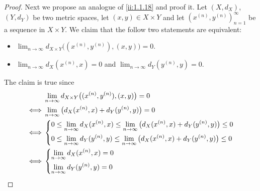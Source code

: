 \begin{proof}
  Next we propose an analogue of \cref{ii:1.1.18} and proof it.
  Let \((X, d_X)\), \((Y, d_Y)\) be two metric spaces, let \((x, y) \in X \times Y\) and let \((x^{(n)}, y^{(n)})_{n = 1}^\infty\) be a sequence in \(X \times Y\).
  We claim that the follow two statements are equivalent:
  \begin{itemize}
    \item \(\lim_{n \to \infty} d_{X \times Y}\big((x^{(n)}, y^{(n)}), (x, y)\big) = 0\).
    \item \(\lim_{n \to \infty} d_X(x^{(n)}, x) = 0\) and \(\lim_{n \to \infty} d_Y(y^{(n)}, y) = 0\).
  \end{itemize}
  The claim is true since
  \begin{align*}
         & \lim_{n \to \infty} d_{X \times Y}\big((x^{(n)}, y^{(n)}), (x, y)\big) = 0                                             \\
    \iff & \lim_{n \to \infty} \big(d_X(x^{(n)}, x) + d_Y(y^{(n)}, y)\big) = 0                                                    \\
    \iff & \begin{dcases}
             0 \leq \lim_{n \to \infty} d_X(x^{(n)}, x) \leq \lim_{n \to \infty} \big(d_X(x^{(n)}, x) + d_Y(y^{(n)}, y)\big) \leq 0 \\
             0 \leq \lim_{n \to \infty} d_Y(y^{(n)}, y) \leq \lim_{n \to \infty} \big(d_X(x^{(n)}, x) + d_Y(y^{(n)}, y)\big) \leq 0
           \end{dcases} \\
    \iff & \begin{dcases}
             \lim_{n \to \infty} d_X(x^{(n)}, x) = 0 \\
             \lim_{n \to \infty} d_Y(y^{(n)}, y) = 0
           \end{dcases}
  \end{align*}


\end{proof}

